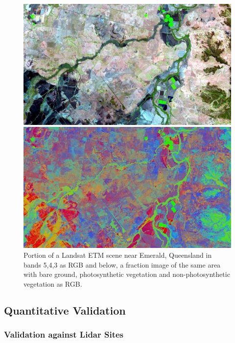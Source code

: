 \documentclass[remotesensing,article,accept,moreauthors,pdftex,12pt,a4paper]{mdpi}
\begin{document}
\begin{figure}
\includegraphics{l5tmre_emer_20040820_ba8m5.jpg}

\includegraphics{l5tmre_emer_20040820_biam5.jpg}
%
%
\caption{\label{fig:imageUnmixed}Portion of a Landsat ETM scene near Emerald, Queensland in bands 5,4,3 as RGB and below, a fraction image of the same area with bare ground, photosynthetic vegetation and non-photosynthetic vegetation as RGB.}

\end{figure} 

\subsection{Quantitative Validation} 

\subsubsection{Validation against Lidar Sites}
\end{document}
